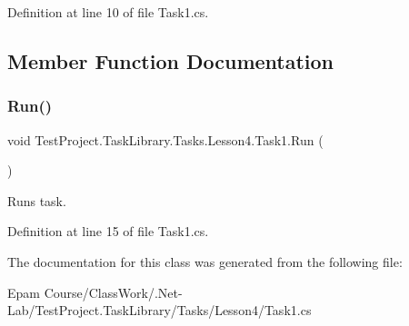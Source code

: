 Definition at line 10 of file Task1.\+cs.



\subsection{Member Function Documentation}
\mbox{\label{class_test_project_1_1_task_library_1_1_tasks_1_1_lesson4_1_1_task1_a7bfcb0a454e481f67e1de59ffc34ecd4}} 
\subsubsection{\texorpdfstring{Run()}{Run()}}
{\footnotesize\ttfamily void Test\+Project.\+Task\+Library.\+Tasks.\+Lesson4.\+Task1.\+Run (\begin{DoxyParamCaption}{ }\end{DoxyParamCaption})}



Runs task. 



Definition at line 15 of file Task1.\+cs.



The documentation for this class was generated from the following file\+:\begin{DoxyCompactItemize}
\item 
Epam Course/\+Class\+Work/.\+Net-\/\+Lab/\+Test\+Project.\+Task\+Library/\+Tasks/\+Lesson4/Task1.\+cs\end{DoxyCompactItemize}
